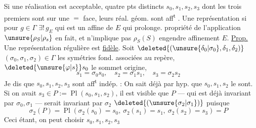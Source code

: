 Si une réalisation est acceptable,  
quatre pts distincts $s_0,s_1,s_2,s_3$ dont les trois premiers sont sur
une $=$ face, leurs réal. géom. sont aff\textsuperscript{t}
.
 Une représentation 
 
 si 
pour  $g\in\Gamma$ $\exists!\,g_E$ qui est un affine de $E$
qui  prolonge.
propriété de l'application $\unsure{\rho_S|\rho_s}$ en fait, et
n'implique pas $\rho_S(S)$ engendre affinement $E$.
\uline{Prop.} Une représentation régulière est \uline{fidèle}.
Soit $\deleted{(\unsure{\delta_0|\sigma_0},\delta_1,\delta_2)}$
$(\sigma_0,\sigma_1,\sigma_2)\in\Gamma$ les symétries fond. associées
au repère, $\deleted{\unsure{\varphi|s}}s_0$ le sommet origine,
\[
s_1=\sigma_0s_0,\quad s_2=\sigma_1s_1,\quad s_3=\sigma_2s_2
\]
Je dis que $s_0,s_1,s_2,s_3$ sont aff\textsuperscript{t} indép. :
On sait déjà par hyp. que $s_0,s_1,s_2$ le sont.
Si on avait $s_3\in P:=\operatorname{Pl}(s_0,s_1,s_2)$, il est visible que
$P$ --- qui est déjà invariant par $\sigma_0,\sigma_1$ --- serait invariant
par $\sigma_2$ $\deleted{(\unsure{\sigma_2|\sigma_1})}$ puisque
\[
\sigma_2(P)=\operatorname{Pl}(\sigma_2(s_0)=s_0,\ \sigma_2(s_1)=s_1,\
\sigma_2(s_2)=s_3)=P
\]
Ceci étant, on peut  choisir $s_0,s_1,s_2,s_3$
